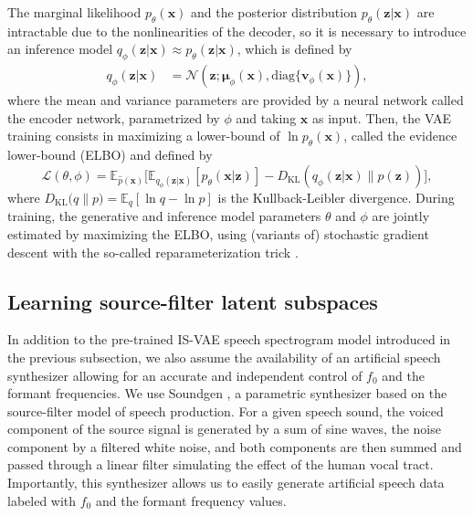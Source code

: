 \documentclass[review]{elsarticle}
\newcommand{\diag}{\text{diag}}
\begin{document}
The marginal likelihood $p_\theta(\mathbf{x})$ and the posterior distribution $p_\theta(\mathbf{z} | \mathbf{x})$ are intractable due to the nonlinearities of the decoder, so it is necessary to introduce an inference model $q_\phi(\mathbf{z} | \mathbf{x}) \approx p_\theta(\mathbf{z} | \mathbf{x})$, which is defined by
\begin{align}
     q_\phi(\mathbf{z} | \mathbf{x}) &= \mathcal{N}\left(\mathbf{z}; \boldsymbol{\mu}_{\phi}(\mathbf{x}), \diag\{\mathbf{v}_{\phi}(\mathbf{x})\} \right), \label{vae_inf_dist}
\end{align}
where the mean and variance parameters are provided by a neural network called the encoder network, parametrized by $\phi$ and taking $\mathbf{x}$ as input. Then, the VAE training consists in maximizing a lower-bound of $\ln p_\theta(\mathbf{x})$, called the evidence lower-bound (ELBO) and defined by
\begin{equation}
    \mathcal{L}(\theta, \phi) = \mathbb{E}_{\hat{p}(\mathbf{x})}\Big[  \mathbb{E}_{q_\phi(\mathbf{z} | \mathbf{x})} \left[ p_\theta(\mathbf{x} | \mathbf{z}) \right] - D_{\text{KL}}\left(q_\phi(\mathbf{z} | \mathbf{x}) \parallel p(\mathbf{z}) \right)\Big],
\end{equation}
where $D_{\text{KL}}\big(q \parallel p \big) = \mathbb{E}_{q} \left[ \ln q - \ln p \right]$ is the Kullback-Leibler divergence. During training, the generative and inference model parameters $\theta$ and $\phi$ are jointly estimated by maximizing the ELBO, using (variants of) stochastic gradient descent with the so-called reparameterization trick \citep{kingma2014auto, rezende2014stochastic}. 

\subsection{Learning source-filter latent subspaces}
\label{subsec:learning_latent_subspaces}

In addition to the pre-trained IS-VAE speech spectrogram model introduced in the previous subsection, we also assume the availability of an artificial speech synthesizer allowing for an accurate and independent control of $f_0$ and the formant frequencies. We use Soundgen \citep{Anikin2019}, a parametric synthesizer based on the source-filter model of speech production. For a given speech sound, the voiced component of the source signal is generated by a sum of sine waves, the noise component by a filtered white noise, and both components are then summed and passed through a linear filter simulating the effect of the human vocal tract. Importantly, this synthesizer allows us to easily generate artificial speech data labeled with $f_0$ and the formant frequency values.
\end{document}
